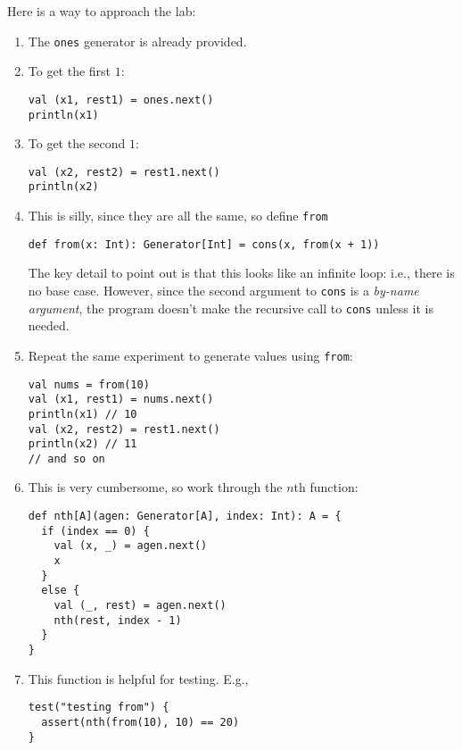 \documentclass[9pt]{extbook}
\begin{document}
Here is a way to approach the lab:

\begin{enumerate}

\item The \lstinline|ones| generator is already provided.

\item To get the first $1$:

\begin{lstlisting}
val (x1, rest1) = ones.next()
println(x1)
\end{lstlisting}

\item To get the second $1$:

\begin{lstlisting}
val (x2, rest2) = rest1.next()
println(x2)
\end{lstlisting}

\item This is silly, since they are all the same, so define \lstinline|from|

\begin{lstlisting}
def from(x: Int): Generator[Int] = cons(x, from(x + 1))
\end{lstlisting}

The key detail to point out is that this looks like an infinite loop: i.e.,
there is no base case. However, since the second argument to
\lstinline|cons| is a \emph{by-name argument}, the program doesn't make the
recursive call to \lstinline|cons| unless it is needed.

\item Repeat the same experiment to generate values using \lstinline|from|:

\begin{lstlisting}
val nums = from(10)
val (x1, rest1) = nums.next()
println(x1) // 10
val (x2, rest2) = rest1.next()
println(x2) // 11
// and so on
\end{lstlisting}

\item This is very cumbersome, so work through the $n$th function:
  
\begin{lstlisting}
def nth[A](agen: Generator[A], index: Int): A = {
  if (index == 0) {
    val (x, _) = agen.next()
    x
  }
  else {
    val (_, rest) = agen.next()
    nth(rest, index - 1)
  }
}
\end{lstlisting}

\item This function is helpful for testing. E.g.,

\begin{lstlisting}
test("testing from") {
  assert(nth(from(10), 10) == 20)
}
\end{lstlisting}

\end{enumerate}
\end{document}

